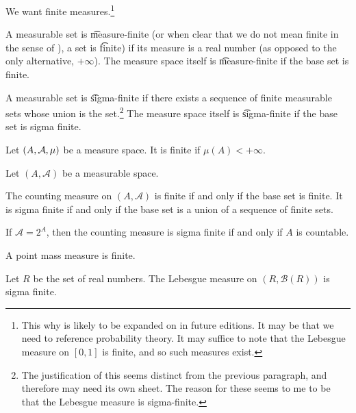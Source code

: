 

We want finite measures.\footnote{This why is likely to be expanded on in future editions. It may be that we need to reference probability theory. It may suffice to note that the Lebesgue measure on $[0, 1]$ is finite, and so such measures exist.}


A measurable set is \t{measure-finite} (or when clear that we do not mean finite in the sense of ), a set is \t{finite}) if its measure is a real number (as opposed to the only alternative, $+\infty$).
The measure space itself is \t{measure-finite} if the base set is finite.

A measurable set is \t{sigma-finite} if there exists a sequence of finite measurable sets whose union is the set.\footnote{The justification of this seems distinct from the previous paragraph, and therefore may need its own sheet. The reason for these seems to me to be that the Lebesgue measure is sigma-finite.}
The measure space itself is \t{sigma-finite} if the base set is sigma finite.


Let $(A, \mathcal{A}, \mu)$ be a measure space.
It is finite if $\mu(A) < +\infty$.

\begin{expl}
Let $(A, \mathcal{A})$ be a measurable space.

The counting measure on $(A, \mathcal{A})$ is
finite if and only if the base set is finite.
It is sigma finite if and only if the base
set is a union of a sequence of finite sets.

If $\mathcal{A} = 2^A$, then the counting
measure is sigma finite if and only if
$A$ is countable.
\end{expl}

\begin{expl}
A point mass measure is finite.
\end{expl}

\begin{expl}
Let $R$ be the set of real numbers.
The Lebesgue measure on
$(R, \mathcal{B}(R))$ is sigma finite.
\end{expl}
